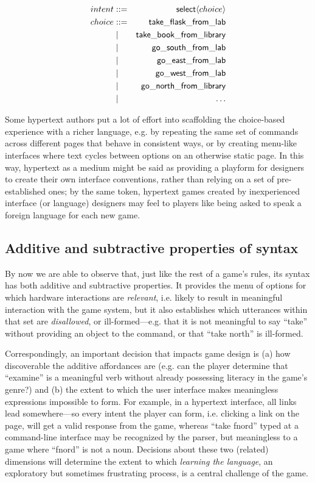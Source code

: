   \begin{eqnarray*}
    intent &::=& \mathsf{select}\langle choice \rangle\\
    choice &::=& \mathsf{take\_flask\_from\_lab}\\
           &\mid& \mathsf{take\_book\_from\_library}\\
           &\mid& \mathsf{go\_south\_from\_lab} \\
           &\mid& \mathsf{go\_east\_from\_lab} \\
           &\mid& \mathsf{go\_west\_from\_lab} \\
           &\mid& \mathsf{go\_north\_from\_library} \\
           &\mid& \hdots
  \end{eqnarray*}

  Some hypertext authors put a lot of effort into scaffolding the
  choice-based experience with a richer language, e.g. by repeating the
  same set of commands across different pages that behave in consistent
  ways, or by creating menu-like interfaces where text cycles between
  options on an otherwise static page. In this way, hypertext as a medium
  might be said as providing a playform for designers to create their own
  interface conventions, rather than relying on a set of pre-established
  ones; by the same token, hypertext games created by inexperienced
  interface (or language) designers may feel to players like being asked to
  speak a foreign language for each new game.

  \subsection*{Additive and subtractive properties of syntax}
  
  By now we are able to observe that, just like the rest of a game's rules,
  its syntax has both additive and subtractive properties. It provides the
  menu of options for which hardware interactions are {\em relevant}, i.e.
  likely to result in meaningful interaction with the game system, but it
  also establishes which utterances within that set are {\em disallowed},
  or ill-formed---e.g. that it is not meaningful to say ``take'' without
  providing an object to the command, or that ``take north'' is ill-formed.

  Correspondingly, an important decision that impacts game design is (a)
  how discoverable the additive affordances are (e.g. can the player
  determine that ``examine'' is a meaningful verb without already
  possessing literacy in the game's genre?) and (b) the extent to which the
  user interface makes meaningless expressions impossible to form. For
  example, in a hypertext interface, all links lead somewhere---so every
  intent the player can form, i.e. clicking a link on the page, will get a
  valid response from the game, whereas ``take fnord'' typed at a
  command-line interface may be recognized by the parser, but meaningless
  to a game where ``fnord'' is not a noun.  Decisions about these two
  (related) dimensions will determine the extent to which {\em learning the
  language}, an exploratory but sometimes frustrating process, is a central
  challenge of the game.
  

